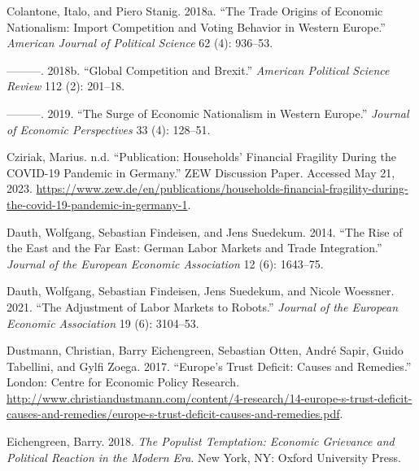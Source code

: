 \documentclass[
]{article}
\newlength{\cslhangindent}
\newlength{\cslentryspacingunit} %
\newenvironment{CSLReferences}[2] %
 {%
  \setlength{\parindent}{0pt}
  \ifodd #1
  \let\oldpar\par
  \def\par{\hangindent=\cslhangindent\oldpar}
  \fi
  \setlength{\parskip}{#2\cslentryspacingunit}
 }%
 {}
\begin{document}
\begin{CSLReferences}{1}{0}
\leavevmode{}%
Colantone, Italo, and Piero Stanig. 2018a. {``The {Trade} {Origins} of
{Economic} {Nationalism}: {Import} {Competition} and {Voting} {Behavior}
in {Western} {Europe}.''} \emph{American Journal of Political Science}
62 (4): 936--53.

\leavevmode{}%
---------. 2018b. {``Global {Competition} and {Brexit}.''}
\emph{American Political Science Review} 112 (2): 201--18.

\leavevmode{}%
---------. 2019. {``The {Surge} of {Economic} {Nationalism} in {Western}
{Europe}.''} \emph{Journal of Economic Perspectives} 33 (4): 128--51.

\leavevmode{}%
Cziriak, Marius. n.d. {``Publication: {Households}' {Financial}
{Fragility} {During} the {COVID}-19 {Pandemic} in {Germany}.''} {ZEW}
{Discussion} {Paper}. Accessed May 21, 2023.
\url{https://www.zew.de/en/publications/households-financial-fragility-during-the-covid-19-pandemic-in-germany-1}.

\leavevmode{}%
Dauth, Wolfgang, Sebastian Findeisen, and Jens Suedekum. 2014. {``The
{Rise} of the {East} and the {Far} {East}: {German} {Labor} {Markets}
and {Trade} {Integration}.''} \emph{Journal of the European Economic
Association} 12 (6): 1643--75.

\leavevmode{}%
Dauth, Wolfgang, Sebastian Findeisen, Jens Suedekum, and Nicole
Woessner. 2021. {``The {Adjustment} of {Labor} {Markets} to {Robots}.''}
\emph{Journal of the European Economic Association} 19 (6): 3104--53.

\leavevmode{}%
Dustmann, Christian, Barry Eichengreen, Sebastian Otten, André Sapir,
Guido Tabellini, and Gylfi Zoega. 2017. {``Europe's {Trust} {Deficit}:
{Causes} and {Remedies}.''} London: Centre for Economic Policy Research.
\url{http://www.christiandustmann.com/content/4-research/14-europe-s-trust-deficit-causes-and-remedies/europe-s-trust-deficit-causes-and-remedies.pdf}.

\leavevmode{}%
Eichengreen, Barry. 2018. \emph{The {Populist} {Temptation}: {Economic}
{Grievance} and {Political} {Reaction} in the {Modern} {Era}}. New York,
NY: Oxford University Press.


\end{CSLReferences}
\end{document}

